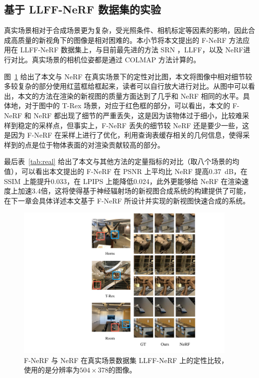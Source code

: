 \subsection{基于 LLFF-NeRF 数据集的实验}
真实场景相对于合成场景更为复杂，受光照条件、相机标定等因素的影响，因此合成高质量的新视角下的图像是相对困难的。本小节将本文提出的 F-NeRF 方法应用在 LLFF-NeRF 数据集上，与目前最先进的方法 SRN\cite{sitzmann2019scene} ，LLFF\cite{mildenhall2019local}，以及 NeRF\cite{mildenhall2020nerf}进行对比。真实场景的相机位姿都是通过 COLMAP \cite{schonberger2016structure} 方法计算的。

图~\ref{fig:llff} 给出了本文与 NeRF 在真实场景下的定性对比图，本文将图像中相对细节较多较复杂的部分使用红蓝框给框起来，读者可以自行放大进行对比。从图中可以看出，本文的方法在渲染的新视图的质量方面达到了几乎和 NeRF 相同的水平。具体地，对于图中的 T-Rex 场景，对应于红色框的部分，可以看出，本文的 F-NeRF 和 NeRF 都出现了细节的严重丢失，这是因为该物体过于细小，比较难采样到稳定的采样点，但事实上，F-NeRF 丢失的细节较 NeRF 还是要少一些，这是因为 F-NeRF 在采样上进行了优化，利用查询表缓存相关的几何信息，使得采样到的点是位于物体表面的对渲染贡献较高的部分。

最后表~\ref{tab:real} 给出了本文与其他方法的定量指标的对比（取八个场景的均值），可以看出本文提出的 F-NeRF 在 PSNR 上平均比 NeRF 提高\SI{0.37}{dB}，在 SSIM 上能提升0.033，在 LPIPS 上能降低0.024，此外更能够给 NeRF 在渲染速度上加速3.4倍，这将使得基于神经辐射场的新视图合成系统的构建提供了可能，在下一章会具体详述本文基于 F-NeRF 所设计并实现的新视图快速合成的系统。


\begin{figure}[tbhp]
    \centering
    \includegraphics[width=0.95\textwidth]{figures/llff.pdf}
    \caption{F-NeRF 与 NeRF 在真实场景数据集 LLFF-NeRF 上的定性比较，使用的是分辨率为$504 \times 378$的图像。}
    \label{fig:llff}
\end{figure}
\newpage

